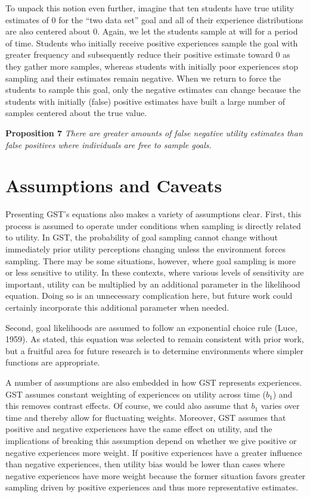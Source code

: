 \documentclass[english,man]{apa6}
\theoremstyle{definition}
\theoremstyle{definition}
\theoremstyle{definition}
\theoremstyle{remark}
\begin{document}
To unpack this notion even further, imagine that ten students have true
utility estimates of 0 for the \enquote{two data set} goal and all of
their experience distributions are also centered about 0. Again, we let
the students sample at will for a period of time. Students who initially
receive positive experiences sample the goal with greater frequency and
subsequently reduce their positive estimate toward 0 as they gather more
samples, whereas students with initially poor experiences stop sampling
and their estimates remain negative. When we return to force the
students to sample this goal, only the negative estimates can change
because the students with initially (false) positive estimates have
built a large number of samples centered about the true value.

\textbf{Proposition 7} \emph{There are greater amounts of false negative
utility estimates than false positives where individuals are free to
sample goals.}

\section{Assumptions and Caveats}\label{assumptions-and-caveats}

Presenting GST's equations also makes a variety of assumptions clear.
First, this process is assumed to operate under conditions when sampling
is directly related to utility. In GST, the probability of goal sampling
cannot change without immediately prior utility perceptions changing
unless the environment forces sampling. There may be some situations,
however, where goal sampling is more or less sensitive to utility. In
these contexts, where various levels of sensitivity are important,
utility can be multiplied by an additional parameter in the likelihood
equation. Doing so is an unnecessary complication here, but future work
could certainly incorporate this additional parameter when needed.

Second, goal likelihoods are assumed to follow an exponential choice
rule (Luce, 1959). As stated, this equation was selected to remain
consistent with prior work, but a fruitful area for future research is
to determine environments where simpler functions are appropriate.

A number of assumptions are also embedded in how GST represents
experiences. GST assumes constant weighting of experiences on utility
across time (\(b_1\)) and this removes contrast effects. Of course, we
could also assume that \(b_1\) varies over time and thereby allow for
fluctuating weights. Moreover, GST assumes that positive and negative
experiences have the same effect on utility, and the implications of
breaking this assumption depend on whether we give positive or negative
experiences more weight. If positive experiences have a greater
influence than negative experiences, then utility bias would be lower
than cases where negative experiences have more weight because the
former situation favors greater sampling driven by positive experiences
and thus more representative estimates.
\end{document}
